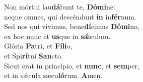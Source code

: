 \evenverse Non mórtui lau\textbf{dá}bunt te, \textbf{Dó}\textbf{mi}ne:~\*\\
\evenverse neque omnes, qui descéndunt \textbf{in} in\textbf{fér}num.\\
\oddverse Sed nos qui vívimus, bene\textbf{dí}cimus \textbf{Dó}\textbf{mi}no,~\*\\
\oddverse ex hoc nunc et \textbf{us}que in \textbf{sǽ}culum.\\
\evenverse Glória \textbf{Pa}tri, et \textbf{Fí}\textbf{li}o,~\*\\
\evenverse et Spi\textbf{rí}tui \textbf{San}cto.\\
\oddverse Sicut erat in princípio, et \textbf{nunc}, et \textbf{sem}per,~\*\\
\oddverse et in sǽcula sæcu\textbf{ló}rum. \textbf{A}men.\\
